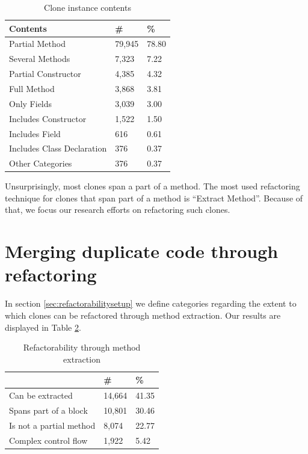 \begin{table}[H]
  \begin{center}
  \caption{Clone instance contents} \label{table:contents}
  \medskip
\begin{tabular}{|l|l|l|}
  \hline
  \textbf{Contents} & \textbf{\#} & \textbf{\%} \\ \hline
  Partial Method     & 79,945 & 78.80 \\ \hline
  Several Methods         & 7,323 & 7.22 \\ \hline
  Partial Constructor      & 4,385 & 4.32 \\ \hline
  Full Method           & 3,868 & 3.81 \\ \hline
  Only Fields           & 3,039 & 3.00 \\ \hline
  Includes Constructor  & 1,522 & 1.50 \\ \hline
  Includes Field        & 616 & 0.61 \\ \hline
  Includes Class Declaration  & 376 & 0.37 \\ \hline
  Other Categories    & 376 & 0.37\\ \hline
\end{tabular}
\end{center}
\end{table}

Unsurprisingly, most clones span a part of a method. The most used refactoring technique for clones that span part of a method is ``Extract Method''. Because of that, we focus our research efforts on refactoring such clones.

\section{Merging duplicate code through refactoring} \label{sec:refactorability}
In section \ref{sec:refactorabilitysetup} we define categories regarding the extent to which clones can be refactored through method extraction. Our results are displayed in Table \ref{table:refactorability}.

\begin{table}[H]
  \begin{center}
  \caption{Refactorability through method extraction} \label{table:refactorability}
  \medskip
\begin{tabular}{|l|l|l|}
\hline
\textbf{}         & \textbf{\#} & \textbf{\%} \\ \hline
Can be extracted     & 14,664 & 41.35 \\ \hline
Spans part of a block  & 10,801 & 30.46 \\ \hline
Is not a partial method   & 8,074 & 22.77 \\ \hline
Complex control flow & 1,922 & 5.42 \\ \hline
\end{tabular}
\end{center}
\end{table}


